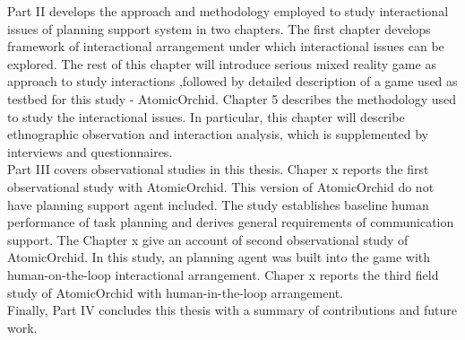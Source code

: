 Part II develops the approach and methodology employed to study interactional issues of planning support system in two chapters. The first chapter develops framework of interactional arrangement under which interactional issues can be explored. The rest of this chapter will introduce serious mixed reality game as approach to study interactions  ,followed by detailed description of a game used as testbed for this study - AtomicOrchid. Chapter 5 describes the methodology used to study the interactional issues. In particular, this chapter will describe ethnographic observation and interaction analysis, which is supplemented by interviews and questionnaires. \\ 

Part III covers observational studies in this thesis. Chaper x reports the first observational study with AtomicOrchid. This version of AtomicOrchid do not have planning support agent included. The study establishes baseline human performance of task planning and derives general requirements of communication support. The Chapter x give an account of second observational study of AtomicOrchid. In this study, an planning agent was built into the game with human-on-the-loop interactional arrangement. Chaper x reports the third field study of AtomicOrchid with human-in-the-loop arrangement. \\ 


Finally, Part IV concludes this thesis with a summary of contributions and future work.\\









